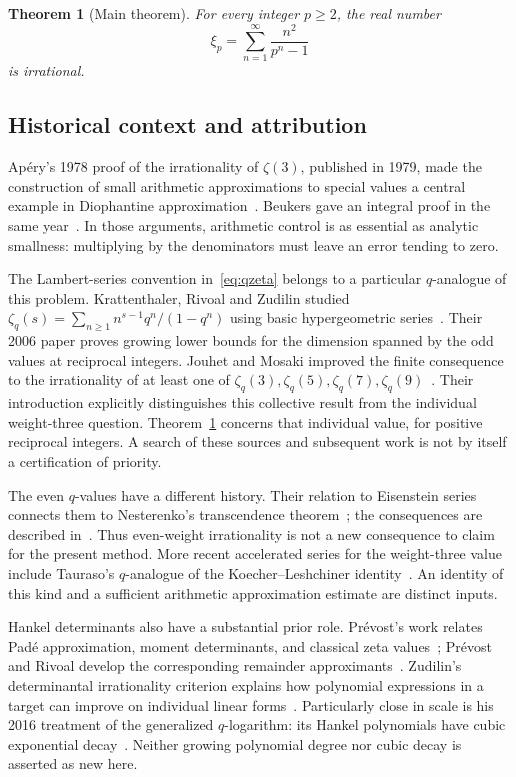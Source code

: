 \documentclass[11pt,letterpaper]{article}
\numberwithin{equation}{section}
\newtheorem{theorem}{Theorem}[section]
\theoremstyle{remark}
\begin{document}
\begin{theorem}[Main theorem]\label{thm:main}
For every integer $p\ge2$, the real number
\begin{equation*}
 \xi_p=\sum_{n=1}^{\infty}\frac{n^2}{p^n-1}
\end{equation*}
is irrational.
\end{theorem}

\subsection{Historical context and attribution}

Ap\'ery's 1978 proof of the irrationality of $\zeta(3)$, published in 1979, made the construction of small arithmetic approximations to special values a central example in Diophantine approximation~\cite{Apery}. Beukers gave an integral proof in the same year~\cite{Beukers}. In those arguments, arithmetic control is as essential as analytic smallness: multiplying by the denominators must leave an error tending to zero.

The Lambert-series convention in~\eqref{eq:qzeta} belongs to a particular $q$-analogue of this problem. Krattenthaler, Rivoal and Zudilin studied $\zeta_q(s)=\sum_{n\ge1}n^{s-1}q^n/(1-q^n)$ using basic hypergeometric series~\cite{KRZ}. Their 2006 paper proves growing lower bounds for the dimension spanned by the odd values at reciprocal integers. Jouhet and Mosaki improved the finite consequence to the irrationality of at least one of $\zeta_q(3),\zeta_q(5),\zeta_q(7),\zeta_q(9)$~\cite[Theorem 1.3]{JM}. Their introduction explicitly distinguishes this collective result from the individual weight-three question. Theorem~\ref{thm:main} concerns that individual value, for positive reciprocal integers. A search of these sources and subsequent work is not by itself a certification of priority.

The even $q$-values have a different history. Their relation to Eisenstein series connects them to Nesterenko's transcendence theorem~\cite{Nesterenko}; the consequences are described in~\cite[Introduction]{KRZ,JM}. Thus even-weight irrationality is not a new consequence to claim for the present method. More recent accelerated series for the weight-three value include Tauraso's $q$-analogue of the Koecher--Leshchiner identity~\cite{Tauraso}. An identity of this kind and a sufficient arithmetic approximation estimate are distinct inputs.

Hankel determinants also have a substantial prior role. Pr\'evost's work relates Pad\'e approximation, moment determinants, and classical zeta values~\cite{Prevost1996,Prevost2019}; Pr\'evost and Rivoal develop the corresponding remainder approximants~\cite{PR2021}. Zudilin's determinantal irrationality criterion explains how polynomial expressions in a target can improve on individual linear forms~\cite{Zudilin2017}. Particularly close in scale is his 2016 treatment of the generalized $q$-logarithm: its Hankel polynomials have cubic exponential decay~\cite[Section 4, equation (8)]{Zudilin2016}. Neither growing polynomial degree nor cubic decay is asserted as new here.
\end{document}
